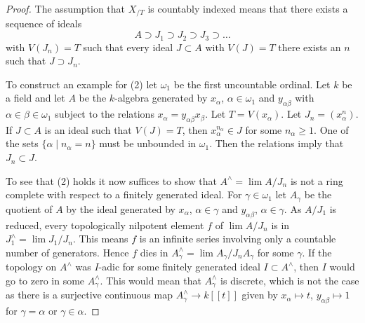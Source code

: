 \begin{proof}
The assumption that $X_{/T}$ is countably indexed means that there exists a
sequence of ideals
$$
A \supset J_1 \supset J_2 \supset J_3 \supset \ldots
$$
with $V(J_n) = T$ such that every ideal $J \subset A$ with $V(J) = T$
there exists an $n$ such that $J \supset J_n$.

\medskip\noindent
To construct an example for (2) let $\omega_1$ be the first uncountable
ordinal. Let $k$ be a field and let
$A$ be the $k$-algebra generated by $x_\alpha$, $\alpha \in \omega_1$
and $y_{\alpha \beta}$ with $\alpha \in \beta \in \omega_1$
subject to the relations $x_\alpha = y_{\alpha \beta} x_\beta$.
Let $T = V(x_\alpha)$. Let $J_n = (x_\alpha^n)$.
If $J \subset A$ is an ideal such that
$V(J) = T$, then $x_\alpha^{n_\alpha} \in J$ for some $n_\alpha \geq 1$.
One of the sets $\{\alpha \mid n_\alpha = n\}$ must be unbounded in
$\omega_1$. Then the relations imply that $J_n \subset J$.

\medskip\noindent
To see that (2) holds it now suffices to show that $A^\wedge = \lim A/J_n$
is not a ring complete with respect to a finitely generated ideal.
For $\gamma \in \omega_1$ let $A_\gamma$ be the quotient of $A$
by the ideal generated by $x_\alpha$, $\alpha \in \gamma$ and
$y_{\alpha \beta}$, $\alpha \in \gamma$. As $A/J_1$ is reduced,
every topologically nilpotent element $f$ of $\lim A/J_n$ is in
$J_1^\wedge = \lim J_1/J_n$. This means $f$ is an infinite series
involving only a countable number of generators. Hence $f$ dies in
$A_\gamma^\wedge = \lim A_\gamma/J_nA_\gamma$ for some $\gamma$.
If the topology on $A^\wedge$ was $I$-adic for some finitely generated ideal
$I \subset A^\wedge$, then $I$ would go to zero in some
$A_\gamma^\wedge$. This would mean that $A_\gamma^\wedge$ is discrete,
which is not the case as there is a surjective continuous map
$A_\gamma^\wedge \to k[[t]]$ given by
$x_\alpha \mapsto t$, $y_{\alpha \beta} \mapsto 1$ for
$\gamma = \alpha$ or $\gamma \in \alpha$.


\end{proof}
